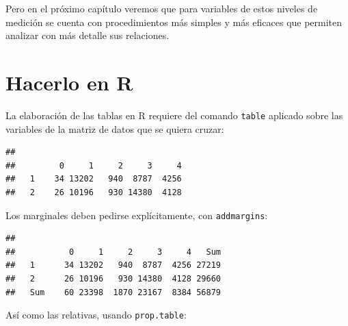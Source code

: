 \documentclass[]{book}
\newenvironment{Shaded}{\begin{snugshade}}{\end{snugshade}}
\newcommand{\FloatTok}[1]{\textcolor[rgb]{0.00,0.00,0.81}{#1}}
\newcommand{\KeywordTok}[1]{\textcolor[rgb]{0.13,0.29,0.53}{\textbf{#1}}}
\newcommand{\NormalTok}[1]{#1}
\newcommand{\OperatorTok}[1]{\textcolor[rgb]{0.81,0.36,0.00}{\textbf{#1}}}
\begin{document}
Pero en el próximo capítulo veremos que para variables de estos niveles de medición se cuenta con procedimientos más simples y más eficaces que permiten analizar con más detalle sus relaciones.

\hypertarget{hacerlo-en-r-2}{%
\section{Hacerlo en R}\label{hacerlo-en-r-2}}

La elaboración de las tablas en R requiere del comando \texttt{table} aplicado sobre las variables de la matriz de datos que se quiera cruzar:

\begin{Shaded}
\end{Shaded}

\begin{verbatim}
##    
##         0     1     2     3     4
##   1    34 13202   940  8787  4256
##   2    26 10196   930 14380  4128
\end{verbatim}

Los marginales deben pedirse explícitamente, con \texttt{addmargins}:

\begin{Shaded}
\end{Shaded}

\begin{verbatim}
##      
##           0     1     2     3     4   Sum
##   1      34 13202   940  8787  4256 27219
##   2      26 10196   930 14380  4128 29660
##   Sum    60 23398  1870 23167  8384 56879
\end{verbatim}

Así como las relativas, usando \texttt{prop.table}:

\begin{Shaded}
\end{Shaded}
\end{document}
